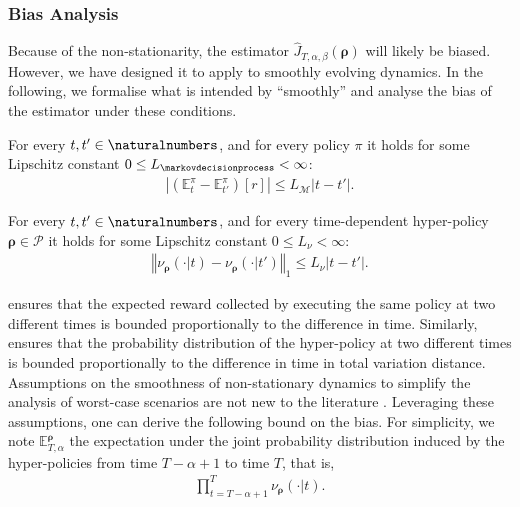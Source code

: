 \subsubsection{Bias Analysis}
\label{subsec:bias_analysis}
Because of the non-stationarity, the estimator $\widehat{J}_{T,\alpha,\beta}(\boldsymbol\rho)$ will likely be biased. 
However, we have designed it to apply to smoothly evolving dynamics. 
In the following, we formalise what is intended by ``smoothly'' and analyse the bias of the estimator under these conditions. 

\begin{ass}
\label{ass:sce}
For every $t,t' \in \naturalnumbers$, and for every policy $\pi$ it holds for some Lipschitz constant $0 \le L_{\markovdecisionprocess} < \infty$:
\begin{align*}
    \left\vert  \left(\mathbb{E}_{t}^{\pi}-\mathbb{E}_{t'}^{\pi} \right)\left[ r \right] \right\vert  \le L_{\mathcal{M}} \lvert t - t'\rvert.
\end{align*}
\end{ass}
\begin{ass}
\label{ass:sch}
For every $t,t' \in \naturalnumbers$, and for every time-dependent hyper-policy $\boldsymbol\rho \in \mathcal{P}$ it holds for some Lipschitz constant $0 \le L_{\nu} < \infty$:
\begin{align*}
    \left\Vert  \nu_{\boldsymbol\rho}(\cdot\vert t) - \nu_{\boldsymbol\rho}(\cdot\vert t') \right\Vert _1 \le L_{\nu} \lvert t - t'\rvert.
\end{align*}
\end{ass}

 ensures that the expected reward collected by executing the same policy at two different times is bounded proportionally to the difference in time.
Similarly,  ensures that the probability distribution of the hyper-policy at two different times is bounded proportionally to the difference in time in total variation distance.
Assumptions on the smoothness of non-stationary dynamics to simplify the analysis of worst-case scenarios are not new to the literature \cite{lecarpentier2019non}.
Leveraging these assumptions, one can derive the following bound on the bias.
For simplicity, we note $\mathbb{E}_{T,\alpha}^{\boldsymbol\rho}$ the expectation under the joint probability distribution induced by the hyper-policies from time $T-\alpha+1$ to time $T$, that is,
\begin{align}
\label{eq:joint_hyper_pol}
    \prod_{t=T-\alpha+1}^{T} \nu_{\boldsymbol\rho}(\cdot\vert t).
\end{align}


